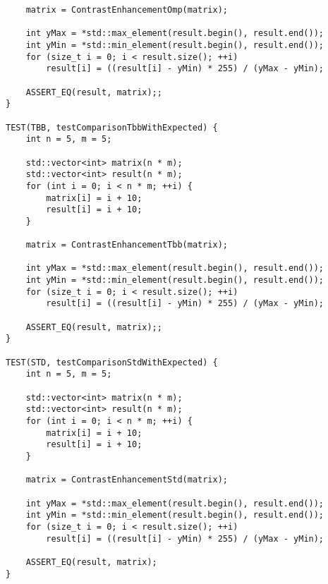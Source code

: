 \documentclass{report}
\begin{document}
\begin{lstlisting}
    matrix = ContrastEnhancementOmp(matrix);

    int yMax = *std::max_element(result.begin(), result.end());
    int yMin = *std::min_element(result.begin(), result.end());
    for (size_t i = 0; i < result.size(); ++i)
        result[i] = ((result[i] - yMin) * 255) / (yMax - yMin);

    ASSERT_EQ(result, matrix);;
}

TEST(TBB, testComparisonTbbWithExpected) {
    int n = 5, m = 5;

    std::vector<int> matrix(n * m);
    std::vector<int> result(n * m);
    for (int i = 0; i < n * m; ++i) {
        matrix[i] = i + 10;
        result[i] = i + 10;
    }

    matrix = ContrastEnhancementTbb(matrix);

    int yMax = *std::max_element(result.begin(), result.end());
    int yMin = *std::min_element(result.begin(), result.end());
    for (size_t i = 0; i < result.size(); ++i)
        result[i] = ((result[i] - yMin) * 255) / (yMax - yMin);

    ASSERT_EQ(result, matrix);;
}

TEST(STD, testComparisonStdWithExpected) {
    int n = 5, m = 5;

    std::vector<int> matrix(n * m);
    std::vector<int> result(n * m);
    for (int i = 0; i < n * m; ++i) {
        matrix[i] = i + 10;
        result[i] = i + 10;
    }

    matrix = ContrastEnhancementStd(matrix);

    int yMax = *std::max_element(result.begin(), result.end());
    int yMin = *std::min_element(result.begin(), result.end());
    for (size_t i = 0; i < result.size(); ++i)
        result[i] = ((result[i] - yMin) * 255) / (yMax - yMin);

    ASSERT_EQ(result, matrix);
}

\end{lstlisting}
\end{document}
